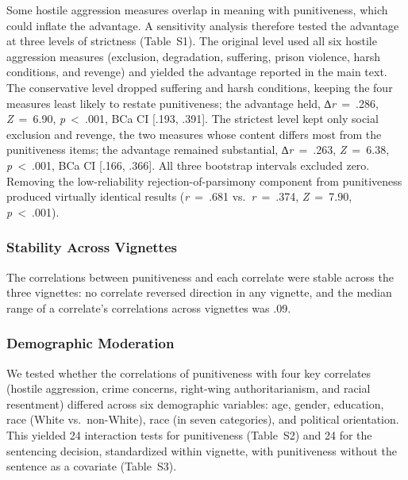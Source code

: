 Some hostile aggression measures overlap in meaning with punitiveness, which could inflate the advantage. A sensitivity analysis therefore tested the advantage at three levels of strictness (Table~S1). The original level used all six hostile aggression measures (exclusion, degradation, suffering, prison violence, harsh conditions, and revenge) and yielded the advantage reported in the main text. The conservative level dropped suffering and harsh conditions, keeping the four measures least likely to restate punitiveness; the advantage held, ∆\emph{r}~=~.286, \emph{Z}~=~6.90, \emph{p}~\textless{}~.001, BCa CI {[}.193, .391{]}. The strictest level kept only social exclusion and revenge, the two measures whose content differs most from the punitiveness items; the advantage remained substantial, ∆\emph{r}~=~.263, \emph{Z}~=~6.38, \emph{p}~\textless{}~.001, BCa CI {[}.166, .366{]}. All three bootstrap intervals excluded zero. Removing the low-reliability rejection-of-parsimony component from punitiveness produced virtually identical results (\emph{r}~=~.681 vs.~\emph{r}~=~.374, \emph{Z}~=~7.90, \emph{p}~\textless{}~.001).

\subsubsection{Stability Across Vignettes}\label{stability-across-vignettes}

The correlations between punitiveness and each correlate were stable across the three vignettes: no correlate reversed direction in any vignette, and the median range of a correlate's correlations across vignettes was .09.

\subsubsection{Demographic Moderation}\label{demographic-moderation}

We tested whether the correlations of punitiveness with four key correlates (hostile aggression, crime concerns, right-wing authoritarianism, and racial resentment) differed across six demographic variables: age, gender, education, race (White vs.~non-White), race (in seven categories), and political orientation. This yielded 24 interaction tests for punitiveness (Table~S2) and 24 for the sentencing decision, standardized within vignette, with punitiveness without the sentence as a covariate (Table~S3).

